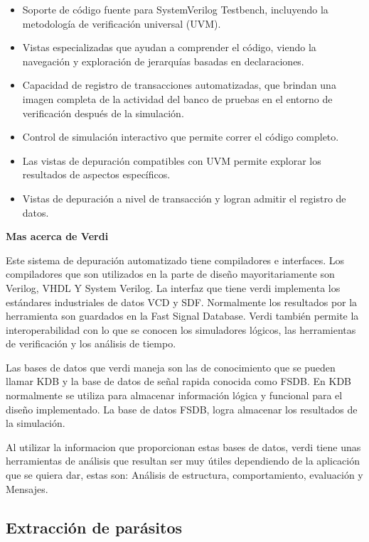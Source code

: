 \begin{itemize}
    \item Soporte de código fuente para SystemVerilog Testbench, incluyendo la metodología de verificación universal (UVM).
    \item Vistas especializadas que ayudan a comprender el código, viendo la navegación y exploración de jerarquías basadas en declaraciones.
    \item Capacidad de registro de transacciones automatizadas, que brindan una imagen completa de la actividad del banco de pruebas en el entorno de verificación después de la simulación.
    \item Control de simulación interactivo que permite correr el código completo.
    \item Las vistas de depuración compatibles con UVM permite explorar los resultados de aspectos específicos.
    \item Vistas de depuración a nivel de transacción y logran admitir el registro de datos.
\end{itemize}

 \cite{Jeff} 

\textbf{Mas acerca de Verdi}

Este sistema de depuración automatizado tiene compiladores e interfaces.
Los compiladores que son utilizados en la parte de diseño mayoritariamente son Verilog, VHDL Y System Verilog. La interfaz que tiene verdi implementa los estándares industriales de datos VCD y SDF. Normalmente los resultados por la herramienta son guardados en la Fast Signal Database.  Verdi también permite la interoperabilidad con lo que se conocen los simuladores lógicos, las herramientas de verificación y los análisis de tiempo.

Las bases de datos que verdi maneja son las de conocimiento que se pueden llamar KDB y la base de datos de señal rapida conocida como FSDB. En KDB normalmente se utiliza para almacenar información lógica y funcional para el diseño implementado.
La base de datos FSDB, logra almacenar los resultados de la simulación.

Al utilizar la informacion que proporcionan estas bases de datos, verdi tiene unas herramientas de análisis que resultan ser muy útiles dependiendo de la aplicación que se quiera dar, estas son: Análisis de estructura, comportamiento, evaluación y Mensajes.


 \subsection*{Extracción de parásitos}

